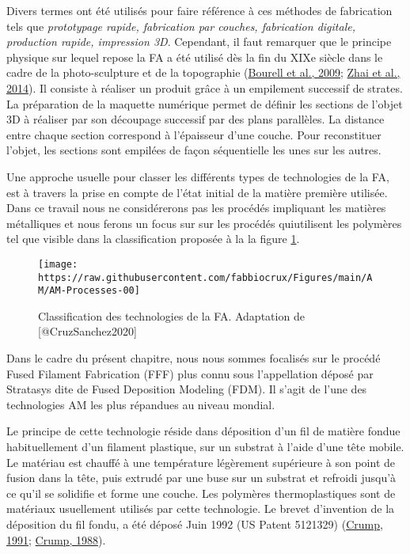\documentclass[
]{article}
\begin{document}
Divers termes ont été utilisés pour faire référence à ces méthodes de fabrication tels que \emph{prototypage rapide, fabrication par couches, fabrication digitale, production rapide, impression 3D}.
Cependant, il faut remarquer que le principe physique sur lequel repose la FA a été utilisé dès la fin du XIXe siècle dans le cadre de la photo-sculpture et de la topographie (\protect\hyperlink{ref-Bourell2009}{Bourell et al., 2009}; \protect\hyperlink{ref-Zhai2014}{Zhai et al., 2014}).
Il consiste à réaliser un produit grâce à un empilement successif de strates. La préparation de la maquette numérique permet de définir les sections de l'objet 3D à réaliser par son découpage successif par des plans parallèles.
La distance entre chaque section correspond à l'épaisseur d'une couche. Pour reconstituer l'objet, les sections sont empilées de façon séquentielle les unes sur les autres.

Une approche usuelle pour classer les différents types de technologies de la FA, est à travers la prise en compte de l'état initial de la matière première utilisée. Dans ce travail nous ne considérerons pas les procédés impliquant les matières métalliques et nous ferons un focus sur sur les procédés quiutilisent les polymères tel que visible dans la classification proposée à la la figure \ref{fig:am-processes}.

\begin{figure}

{\centering \texttt{[image: https://raw.githubusercontent.com/fabbiocrux/Figures/main/AM/AM-Processes-00]} 

}

\caption{Classification des technologies de la FA. Adaptation de [@CruzSanchez2020]}\label{fig:am-processes}
\end{figure}

Dans le cadre du présent chapitre, nous nous sommes focalisés sur le procédé Fused Filament Fabrication (FFF) plus connu sous l'appellation déposé par Stratasys dite de Fused Deposition Modeling (FDM). Il s'agit de l'une des technologies AM les plus répandues au niveau mondial.

Le principe de cette technologie réside dans déposition d'un fil de matière fondue habituellement d'un filament plastique, sur un substrat à l'aide d'une tête mobile. Le matériau est chauffé à une température légèrement supérieure à son point de fusion dans la tête, puis extrudé par une buse sur un substrat et refroidi jusqu'à ce qu'il se solidifie et forme une couche. Les polymères thermoplastiques sont de matériaux usuellement utilisés par cette technologie. Le brevet d'invention de la déposition du fil fondu, a été déposé Juin 1992 (US Patent 5121329) (\protect\hyperlink{ref-Crump1991}{Crump, 1991}; \protect\hyperlink{ref-Crump1988}{Crump, 1988}).
\end{document}
